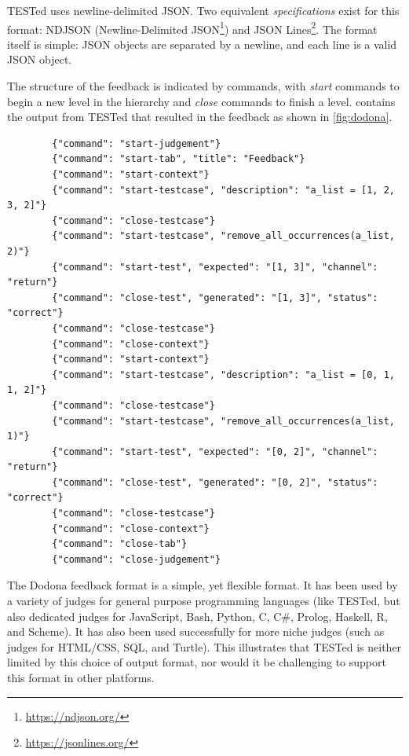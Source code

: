 \documentclass[../main]{subfiles}
\begin{document}
TESTed uses newline-delimited JSON\@.
Two equivalent \emph{specifications} exist for this format: NDJSON (Newline-Delimited JSON\footnote{\url{https://ndjson.org/}}) and JSON Lines\footnote{\url{https://jsonlines.org/}}.
The format itself is simple: JSON objects are separated by a newline, and each line is a valid JSON object.

The structure of the feedback is indicated by commands, with \emph{start} commands to begin a new level in the hierarchy and \emph{close} commands to finish a level.
 contains the output from TESTed that resulted in the feedback as shown in \cref{fig:dodona}.

\begin{listing}
    \begin{verbatim}
        {"command": "start-judgement"}
        {"command": "start-tab", "title": "Feedback"}
        {"command": "start-context"}
        {"command": "start-testcase", "description": "a_list = [1, 2, 3, 2]"}
        {"command": "close-testcase"}
        {"command": "start-testcase", "remove_all_occurrences(a_list, 2)"}
        {"command": "start-test", "expected": "[1, 3]", "channel": "return"}
        {"command": "close-test", "generated": "[1, 3]", "status": "correct"}
        {"command": "close-testcase"}
        {"command": "close-context"}
        {"command": "start-context"}
        {"command": "start-testcase", "description": "a_list = [0, 1, 1, 2]"}
        {"command": "close-testcase"}
        {"command": "start-testcase", "remove_all_occurrences(a_list, 1)"}
        {"command": "start-test", "expected": "[0, 2]", "channel": "return"}
        {"command": "close-test", "generated": "[0, 2]", "status": "correct"}
        {"command": "close-testcase"}
        {"command": "close-context"}
        {"command": "close-tab"}
        {"command": "close-judgement"}
    \end{verbatim}
    \caption{
        Example of the output generated by TESTed, which is rendered in \cref{fig:dodona}.
        As before, each context consists of two testcases, the first of which has no tests, while the second has one test (the expected return value).
    }
    \label{lst:tested-output-example}
\end{listing}

The Dodona feedback format is a simple, yet flexible format.
It has been used by a variety of judges for general purpose programming languages (like TESTed, but also dedicated judges for JavaScript, Bash, Python, C, C\#, Prolog, Haskell, R, and Scheme).
It has also been used successfully for more niche judges (such as judges for \textsc{HTML}/\textsc{CSS}, \textsc{SQL}, and Turtle).
This illustrates that TESTed is neither limited by this choice of output format, nor would it be challenging to support this format in other platforms.
\end{document}
